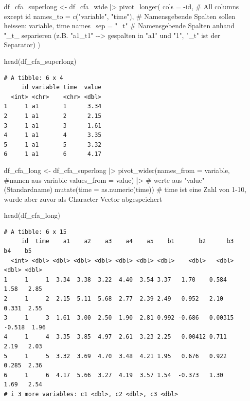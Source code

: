 \documentclass[
  letterpaper,
  DIV=11,
  numbers=noendperiod]{scrreprt}
\newenvironment{Shaded}{\begin{snugshade}}{\end{snugshade}}
\newcommand{\AttributeTok}[1]{\textcolor[rgb]{0.40,0.45,0.13}{#1}}
\newcommand{\CommentTok}[1]{\textcolor[rgb]{0.37,0.37,0.37}{#1}}
\newcommand{\FunctionTok}[1]{\textcolor[rgb]{0.28,0.35,0.67}{#1}}
\newcommand{\NormalTok}[1]{\textcolor[rgb]{0.00,0.23,0.31}{#1}}
\newcommand{\OtherTok}[1]{\textcolor[rgb]{0.00,0.23,0.31}{#1}}
\newcommand{\SpecialCharTok}[1]{\textcolor[rgb]{0.37,0.37,0.37}{#1}}
\newcommand{\StringTok}[1]{\textcolor[rgb]{0.13,0.47,0.30}{#1}}
\begin{document}
\begin{Shaded}
\begin{Highlighting}[]
\NormalTok{df\_cfa\_superlong }\OtherTok{\textless{}{-}}\NormalTok{ df\_cfa\_wide }\SpecialCharTok{|\textgreater{}} 
  \FunctionTok{pivot\_longer}\NormalTok{(}
    \AttributeTok{cols =} \SpecialCharTok{{-}}\NormalTok{id, }\CommentTok{\# All columns except id}
    \AttributeTok{names\_to =} \FunctionTok{c}\NormalTok{(}\StringTok{"variable"}\NormalTok{, }\StringTok{"time"}\NormalTok{), }\CommentTok{\# Namensgebende Spalten sollen heissen: variable, time}
    \AttributeTok{names\_sep =} \StringTok{"\_t"} 
    \CommentTok{\# Namensgebende Spalten anhand "\_t\_ separieren (z.B. "a1\_t1" {-}{-}\textgreater{} gespalten in "a1" und "1", "\_t" ist der Separator)}
\NormalTok{  ) }

\FunctionTok{head}\NormalTok{(df\_cfa\_superlong)}
\end{Highlighting}
\end{Shaded}

\begin{verbatim}
# A tibble: 6 x 4
     id variable time  value
  <int> <chr>    <chr> <dbl>
1     1 a1       1      3.34
2     1 a1       2      2.15
3     1 a1       3      1.61
4     1 a1       4      3.35
5     1 a1       5      3.32
6     1 a1       6      4.17
\end{verbatim}

\begin{Shaded}
\begin{Highlighting}[]
\NormalTok{df\_cfa\_long }\OtherTok{\textless{}{-}}\NormalTok{ df\_cfa\_superlong }\SpecialCharTok{|\textgreater{}} 
  \FunctionTok{pivot\_wider}\NormalTok{(}\AttributeTok{names\_from =}\NormalTok{ variable, }\CommentTok{\#namen aus variable}
              \AttributeTok{values\_from =}\NormalTok{ value) }\SpecialCharTok{|\textgreater{}}  \CommentTok{\# werte aus "value" (Standardname)}
  \FunctionTok{mutate}\NormalTok{(}\AttributeTok{time =} \FunctionTok{as.numeric}\NormalTok{(time)) }\CommentTok{\# time ist eine Zahl von 1{-}10, wurde aber zuvor als Character{-}Vector abgespeichert}

\FunctionTok{head}\NormalTok{(df\_cfa\_long)}
\end{Highlighting}
\end{Shaded}

\begin{verbatim}
# A tibble: 6 x 15
     id  time    a1    a2    a3    a4    a5    b1       b2      b3     b4    b5
  <int> <dbl> <dbl> <dbl> <dbl> <dbl> <dbl> <dbl>    <dbl>   <dbl>  <dbl> <dbl>
1     1     1  3.34  3.38  3.22  4.40  3.54 3.37   1.70    0.584    1.58   2.85
2     1     2  2.15  5.11  5.68  2.77  2.39 2.49   0.952   2.10     0.331  2.55
3     1     3  1.61  3.00  2.50  1.90  2.81 0.992 -0.686   0.00315 -0.518  1.96
4     1     4  3.35  3.85  4.97  2.61  3.23 2.25   0.00412 0.711    2.19   2.03
5     1     5  3.32  3.69  4.70  3.48  4.21 1.95   0.676   0.922    0.285  2.36
6     1     6  4.17  5.66  3.27  4.19  3.57 1.54  -0.373   1.30     1.69   2.54
# i 3 more variables: c1 <dbl>, c2 <dbl>, c3 <dbl>
\end{verbatim}
\end{document}
